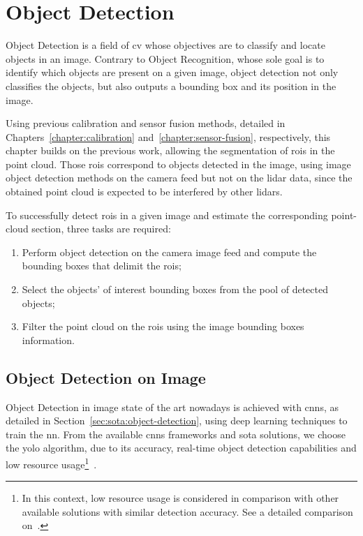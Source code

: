 \chapter{Object Detection}
\label{chapter:object-detection}

Object Detection is a field of \acf{cv} whose objectives are to classify and locate objects in an image. Contrary to Object Recognition, whose sole goal is to identify which objects are present on a given image, object detection not only classifies the objects, but also outputs a bounding box and its position in the image. 

Using previous calibration and sensor fusion methods, detailed in Chapters~\ref{chapter:calibration} and~\ref{chapter:sensor-fusion}, respectively, this chapter builds on the previous work, allowing the segmentation of \acfp{roi} in the point cloud. Those \acp{roi} correspond to objects detected in the image, using image object detection methods on the camera feed but not on the \ac{lidar} data, since the obtained point cloud is expected to be interfered by other \acp{lidar}.

To successfully detect \acp{roi} in a given image and estimate the corresponding point-cloud section, three tasks are required: 
\begin{enumerate}
	\item Perform object detection on the camera image feed and compute the bounding boxes that delimit the \acp{roi};
	\item Select the objects' of interest bounding boxes from the pool of detected objects;
	\item Filter the point cloud on the \acp{roi} using the image bounding boxes information.
\end{enumerate}

\section{Object Detection on Image}
\label{sec:object-detection:image}

Object Detection in image state of the art nowadays is achieved with \acfp{cnn}, as detailed in Section~\ref{sec:sota:object-detection}, using deep learning techniques to train the \acl{nn}. From the available \acp{cnn} frameworks and \acl{sota} solutions, we choose the \acf{yolo} algorithm, due to its accuracy, real-time object detection capabilities and low resource usage\footnote{In this context, low resource usage is considered in comparison with other available solutions with similar detection accuracy. See a detailed comparison on~\cite{Redmon2018}.}~\cite{Redmon2016, Redmon2017}.

